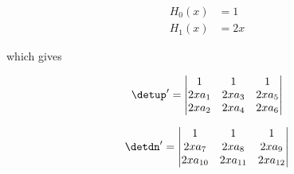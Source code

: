 \begin{align*}
H_0(x)&=1\\
H_1(x)&=2x
\end{align*}

which gives 

\begin{equation}
\detup'=
\begin{vmatrix} 
1&1&1\\
2xa_1&2xa_3&2xa_5\\
2xa_2&2xa_4&2xa_6
\end{vmatrix}
\end{equation}

\begin{equation}
\detdn'=
\begin{vmatrix} 
1&1&1\\
2xa_7&2xa_8&2xa_9\\
2xa_{10}&2xa_{11}&2xa_{12}
\end{vmatrix}
\end{equation}